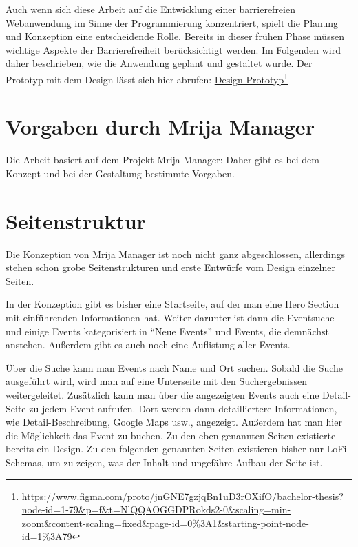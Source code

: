 Auch wenn sich diese Arbeit auf die Entwicklung einer barrierefreien Webanwendung im Sinne der Programmierung konzentriert, spielt die Planung und Konzeption eine entscheidende Rolle. Bereits in dieser frühen Phase müssen wichtige Aspekte der Barrierefreiheit berücksichtigt werden. Im Folgenden wird daher beschrieben, wie die Anwendung geplant und gestaltet wurde.
Der Prototyp mit dem Design lässt sich hier abrufen: 
\href{https://www.figma.com/proto/jnGNE7gzjqBn1uD3rOXifO/bachelor-thesis?node-id=1-79\&p=f\&t=NlQQAOGGDPRokds2-0\&scaling=min-zoom\&content-scaling=fixed\&page-id=0\%3A1\&starting-point-node-id=1\%3A79}{Design Prototyp}\footnote{\url{https://www.figma.com/proto/jnGNE7gzjqBn1uD3rOXifO/bachelor-thesis?node-id=1-79\&p=f\&t=NlQQAOGGDPRokds2-0\&scaling=min-zoom\&content-scaling=fixed\&page-id=0\%3A1\&starting-point-node-id=1\%3A79}}
\section{Vorgaben durch Mrija Manager}
Die Arbeit basiert auf dem Projekt Mrija Manager: Daher gibt es bei dem Konzept und bei der Gestaltung bestimmte Vorgaben.

\section{Seitenstruktur}
Die Konzeption von Mrija Manager ist noch nicht ganz abgeschlossen, allerdings stehen schon grobe Seitenstrukturen und erste Entwürfe vom Design einzelner Seiten. 

In der Konzeption gibt es bisher eine Startseite, auf der man eine Hero Section mit einführenden Informationen hat. Weiter darunter ist dann die Eventsuche und einige Events kategorisiert in \enquote{Neue Events} und Events, die demnächst anstehen. Außerdem gibt es auch noch eine Auflistung aller Events.

Über die Suche kann man Events nach Name und Ort suchen. Sobald die Suche ausgeführt wird, wird man auf eine Unterseite mit den Suchergebnissen weitergeleitet. Zusätzlich kann man über die angezeigten Events auch eine Detail-Seite zu jedem Event aufrufen. Dort werden dann detailliertere Informationen, wie Detail-Beschreibung, Google Maps usw., angezeigt. Außerdem hat man hier die Möglichkeit das Event zu buchen. Zu den eben genannten Seiten existierte bereits ein Design. Zu den folgenden genannten Seiten existieren bisher nur LoFi-Schemas, um zu zeigen, was der Inhalt und ungefähre Aufbau der Seite ist.

